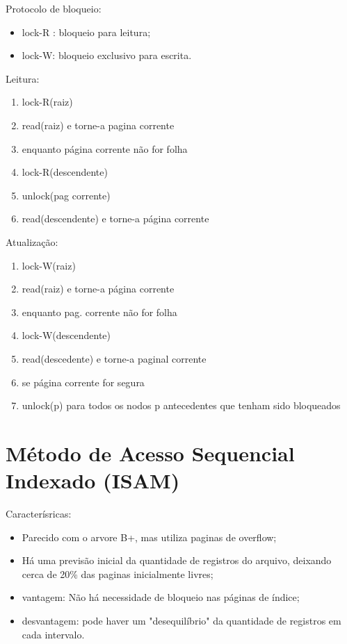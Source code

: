 \documentclass{article}
\begin{document}
Protocolo de bloqueio:

\begin{itemize}    
   \item lock-R : bloqueio para leitura;
   \item lock-W: bloqueio exclusivo para escrita.
\end{itemize}

Leitura:

\begin{enumerate}
   \item lock-R(raiz) 
   \item read(raiz)  e torne-a pagina corrente
   \item enquanto página corrente não for folha
   \item lock-R(descendente)
   \item unlock(pag corrente)
   \item read(descendente) e torne-a página corrente
\end{enumerate}

Atualização:

\begin{enumerate}
   \item lock-W(raiz)
   \item read(raiz) e torne-a página corrente
   \item enquanto pag. corrente não for folha
   \item lock-W(descendente)
   \item read(descedente) e torne-a paginal corrente
   \item se página corrente for segura
   \item unlock(p) para todos os nodos p antecedentes que tenham sido bloqueados
\end{enumerate}

\newpage

\section{Método de Acesso Sequencial Indexado (ISAM)}

Caracterísricas:

\begin{itemize}
   \item Parecido com o arvore B+, mas utiliza paginas de overflow;
   \item Há uma previsão inicial da quantidade de registros do arquivo, deixando cerca de 20\% das
paginas inicialmente livres;
   \item vantagem: Não há necessidade de bloqueio nas páginas de índice;
   \item desvantagem:  pode haver um "desequilíbrio" da quantidade de registros em cada intervalo.
\end{itemize}
\end{document}
